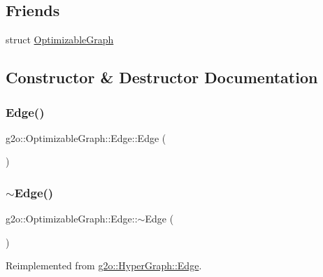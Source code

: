 \subsection*{Friends}
\begin{DoxyCompactItemize}
\item 
struct \mbox{\hyperlink{classg2o_1_1_optimizable_graph_1_1_edge_a45d35331ee3deca38c26d1efb6b961ae}{Optimizable\+Graph}}
\end{DoxyCompactItemize}


\subsection{Constructor \& Destructor Documentation}
\mbox{\label{classg2o_1_1_optimizable_graph_1_1_edge_a6568eb7f3b3e4299473ec3230199aa70}} 
\subsubsection{\texorpdfstring{Edge()}{Edge()}}
{\footnotesize\ttfamily g2o\+::\+Optimizable\+Graph\+::\+Edge\+::\+Edge (\begin{DoxyParamCaption}{ }\end{DoxyParamCaption})}

\mbox{\label{classg2o_1_1_optimizable_graph_1_1_edge_a62de61a43d47cf223fe39265dac13ca5}} 
\subsubsection{\texorpdfstring{$\sim$\+Edge()}{~Edge()}}
{\footnotesize\ttfamily g2o\+::\+Optimizable\+Graph\+::\+Edge\+::$\sim$\+Edge (\begin{DoxyParamCaption}{ }\end{DoxyParamCaption})\hspace{0.3cm}{\ttfamily [virtual]}}



Reimplemented from \mbox{\hyperlink{classg2o_1_1_hyper_graph_1_1_edge_a202cb31558caef5a7bf18a49281173a3}{g2o\+::\+Hyper\+Graph\+::\+Edge}}.



